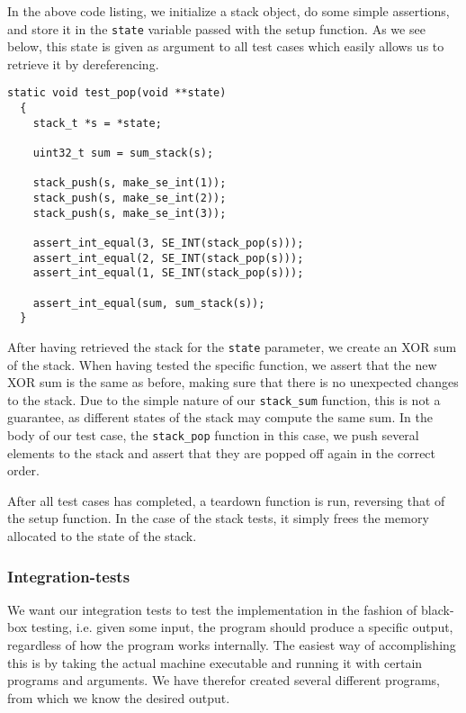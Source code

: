 In the above code listing, we initialize a stack object, do some
simple assertions, and store it in the {\tt state} variable passed
with the setup function. As we see below, this state is given as
argument to all test cases which easily allows us to retrieve it by
dereferencing.
\begin{lstlisting}[language={[ANSI]C},caption={Unit-test of {\tt stack\_pop}}]
  static void test_pop(void **state)
  {
    stack_t *s = *state;

    uint32_t sum = sum_stack(s);

    stack_push(s, make_se_int(1));
    stack_push(s, make_se_int(2));
    stack_push(s, make_se_int(3));

    assert_int_equal(3, SE_INT(stack_pop(s)));
    assert_int_equal(2, SE_INT(stack_pop(s)));
    assert_int_equal(1, SE_INT(stack_pop(s)));

    assert_int_equal(sum, sum_stack(s));
  }
\end{lstlisting}

After having retrieved the stack for the {\tt state} parameter, we create an XOR
sum of the stack. When having tested the specific function, we assert that the
new XOR sum is the same as before, making sure that there is no unexpected
changes to the stack. Due to the simple nature of our {\tt stack\_sum} function,
this is not a guarantee, as different states of the stack may compute the same
sum. %
In the body of our test case, the {\tt stack\_pop} function in this case, we
push several elements to the stack and assert that they are popped off again in
the correct order.

After all test cases has completed, a teardown function is run, reversing that
of the setup function. In the case of the stack tests, it simply frees the
memory allocated to the state of the stack.
%


\subsubsection{Integration-tests}
We want our integration tests to test the implementation in the fashion of
black-box testing, i.e. given some input, the program should produce a specific
output, regardless of how the program works internally. The easiest way of
accomplishing this is by taking the actual machine executable and running it
with certain programs and arguments. We have therefor created several different
programs, from which we know the desired output.

